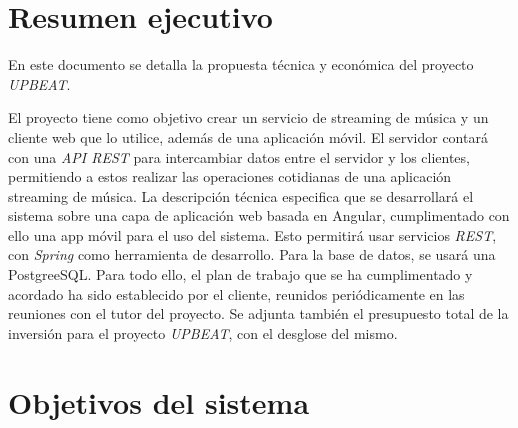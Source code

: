 \documentclass{article}
\begin{document}
\maketitle
\newpage
\section*{Resumen ejecutivo}
En este documento se detalla la propuesta técnica y económica del proyecto \textit{UPBEAT}.

El proyecto tiene como objetivo crear un servicio de streaming de música y un cliente web que lo utilice, además de una aplicación móvil. El servidor contará con una \textit{API REST} para intercambiar datos entre el servidor y los clientes, permitiendo a estos realizar las operaciones cotidianas de una aplicación streaming de música.
\hfill\break
La descripción técnica especifica que se desarrollará el sistema sobre una capa de aplicación web basada en Angular, cumplimentado con ello una app móvil para el uso del sistema.
Esto permitirá usar servicios \textit{REST}, con \textit{Spring} como herramienta de desarrollo. Para la base de datos, se usará una PostgreeSQL. 
\hfill\break
Para todo ello, el plan de trabajo que se ha cumplimentado y acordado ha sido establecido por el cliente, reunidos periódicamente en las reuniones con el tutor del proyecto. 
\hfill\break
Se adjunta también el presupuesto total de la inversión para el proyecto \textit{UPBEAT}, con el desglose del mismo.

\newpage
\tableofcontents %
{}
\newpage
\pagestyle{fancy}
\section{Objetivos del sistema}
\end{document}
